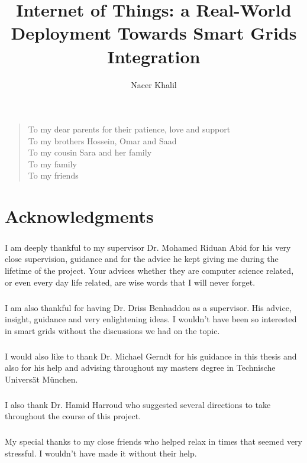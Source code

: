 \documentclass[oneside,12pt,a4paper,final]{book}
\author{Nacer Khalil}
\title{Internet of Things: a Real-World Deployment Towards Smart Grids Integration}
\newenvironment{dedication}{\vspace{6ex}\begin{quotation}\begin{center}\begin{em}}{\par\end{em}\end{center}\end{quotation}}
\begin{document}
\doublespacing

\frontmatter


\chapter{} %
\begin{dedication}
To my dear parents for their patience, love and support \\
To my brothers Hossein, Omar and Saad \\
To my cousin Sara and her family \\
To my family \\
To my friends \\

\end{dedication}
\chapter{Acknowledgments}
\paragraph{}
I am deeply thankful to my supervisor Dr. Mohamed Riduan Abid for his very close supervision, guidance and for the advice he kept giving me during the lifetime of the project. Your advices whether they are computer science related, or even every day life related, are wise words that I will never forget.
\paragraph{}
I am also thankful for having Dr. Driss Benhaddou as a supervisor. His advice, insight, guidance and very enlightening ideas. I wouldn't have been so interested in smart grids without the discussions we had on the topic.
\paragraph{}
I would also like to thank Dr. Michael Gerndt for his guidance in this thesis and also for his help and advising throughout my masters degree in Technische Universät München.
\paragraph{}
I  also thank Dr. Hamid Harroud who suggested several directions to take throughout the course of this project.
\paragraph{}
My special thanks to my close friends who helped relax in times that seemed very stressful. I wouldn't have made it without their help.
\end{document}
